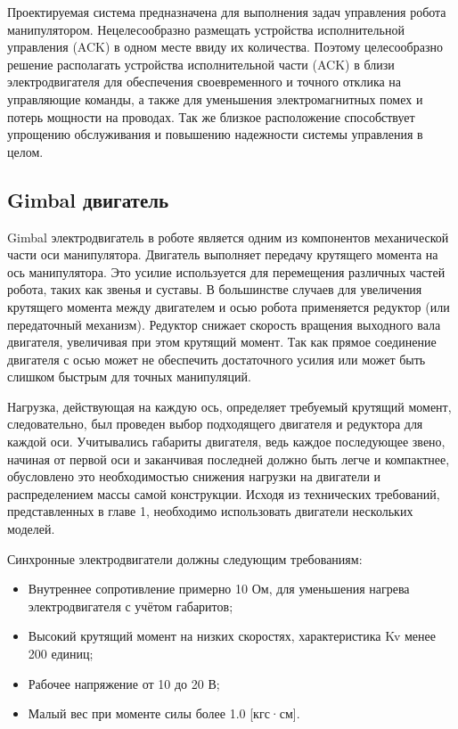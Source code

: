 Проектируемая система предназначена для выполнения задач управления  робота манипулятором. Нецелесообразно размещать устройства исполнительной управления (ACK) в одном месте ввиду их количества. Поэтому целесообразно решение располагать устройства исполнительной части (ACK) в близи электродвигателя для обеспечения своевременного и точного отклика на управляющие команды, а также для уменьшения электромагнитных помех и потерь мощности на проводах. Так же близкое расположение способствует упрощению обслуживания и повышению надежности системы управления в целом.

\subsection{Gimbal двигатель}

Gimbal электродвигатель в роботе является одним из компонентов механической части оси манипулятора. Двигатель выполняет передачу крутящего момента на ось манипулятора. Это усилие используется для перемещения различных частей робота, таких как звенья и суставы. В большинстве случаев для увеличения крутящего момента между двигателем и осью робота применяется редуктор (или передаточный механизм). Редуктор снижает скорость вращения выходного вала двигателя, увеличивая при этом крутящий момент. Так как прямое соединение двигателя с осью может не обеспечить достаточного усилия или может быть слишком быстрым для точных манипуляций.

Нагрузка, действующая на каждую ось, определяет требуемый крутящий момент, следовательно, был проведен выбор подходящего двигателя и редуктора для каждой оси. Учитывались габариты двигателя, ведь каждое последующее звено, начиная от первой оси и заканчивая последней должно быть легче и компактнее, обусловлено это необходимостью снижения нагрузки на двигатели и распределением массы самой конструкции. Исходя из технических требований, представленных в главе 1, необходимо использовать двигатели нескольких моделей.

Синхронные электродвигатели должны  следующим требованиям:

\begin{itemize}
	\item Внутреннее сопротивление примерно 10 Ом, для уменьшения нагрева электродвигателя с учётом габаритов;
	\item Высокий крутящий момент на низких скоростях, характеристика Kv менее 200 единиц;
	\item Рабочее напряжение от 10 до 20 В;
	\item Малый вес при моменте силы более 1.0 [кгс·см].
\end{itemize}

